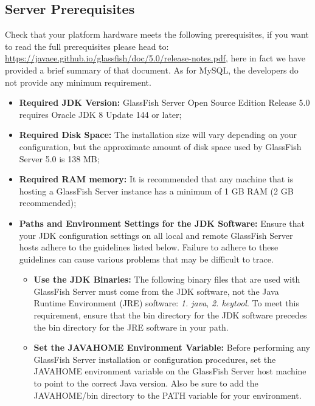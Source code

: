 \subsection{Server Prerequisites}
\label{subsect:ServerPrerequisites}
Check that your platform hardware meets the following prerequisites, if you want to read the full prerequisites please head to: \href{https://javaee.github.io/glassfish/doc/5.0/release-notes.pdf}{\color{blue}https://javaee.github.io/glassfish/doc/5.0/release-notes.pdf}, here in fact we have provided a brief summary of that document. As for MySQL, the developers do not provide any minimum requirement. 
\begin{itemize}
	\item \textbf{Required JDK Version:} GlassFish Server Open Source Edition Release 5.0 requires Oracle JDK 8 Update 144 or later;
	\item \textbf{Required Disk Space:} The installation size will vary depending on your configuration, but the approximate amount of disk space used by GlassFish Server 5.0 is 138 MB;
	\item \textbf{Required RAM memory:} It is recommended that any machine that is hosting a GlassFish Server instance has a minimum of 1 GB RAM (2 GB recommended); 
	\item \textbf{Paths and Environment Settings for the JDK Software:} Ensure that your JDK configuration settings on all local and remote GlassFish Server hosts adhere to the guidelines listed below. Failure to adhere to these guidelines can cause various problems that may be difficult to trace.
	\begin{itemize}
		\item \textbf{Use the JDK Binaries:} The following binary files that are used with GlassFish Server must come from the JDK software, not the Java Runtime Environment (JRE) software: \textit{1. java}, \textit{2. keytool}. To meet this requirement, ensure that the bin directory for the JDK software precedes the bin directory for the JRE software in your path.
		\item \textbf{Set the JAVA\textunderscore HOME Environment Variable:} Before performing any GlassFish Server installation or configuration procedures, set the JAVA\textunderscore HOME environment variable on the GlassFish Server host machine to point to the correct Java version. Also be sure to add the JAVA\textunderscore HOME/bin directory to the PATH variable for your environment.
	\end{itemize}
\end{itemize}

